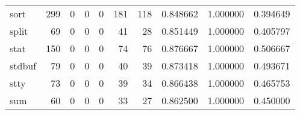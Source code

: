 \begin{tabular}{lrrrrrrrrr}
sort      &                                       299 &                                                  0 &                                                  0 &                                                  0 &                                                181 &                                                118 &                                           0.848662 &                               1.000000 &                             0.394649 \\
split     &                                        69 &                                                  0 &                                                  0 &                                                  0 &                                                 41 &                                                 28 &                                           0.851449 &                               1.000000 &                             0.405797 \\
stat      &                                       150 &                                                  0 &                                                  0 &                                                  0 &                                                 74 &                                                 76 &                                           0.876667 &                               1.000000 &                             0.506667 \\
stdbuf    &                                        79 &                                                  0 &                                                  0 &                                                  0 &                                                 40 &                                                 39 &                                           0.873418 &                               1.000000 &                             0.493671 \\
stty      &                                        73 &                                                  0 &                                                  0 &                                                  0 &                                                 39 &                                                 34 &                                           0.866438 &                               1.000000 &                             0.465753 \\
sum       &                                        60 &                                                  0 &                                                  0 &                                                  0 &                                                 33 &                                                 27 &                                           0.862500 &                               1.000000 &                             0.450000 \\

\end{tabular}

